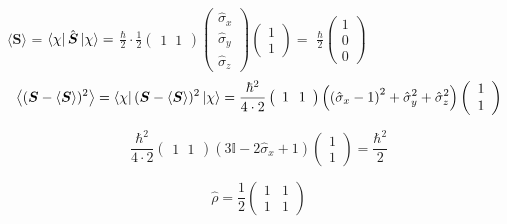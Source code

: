 \begin{solution}
	$\langle\boldsymbol{S}\rangle$ = $\bra{\chi}\hat{\boldsymbol{S}}\ket{\chi} = $
	$\displaystyle \frac{\hbar}{2} \cdot \frac{1}{2} \left(\begin{array}{l}{1} \hspace{7pt} {1}\end{array}\right)
	 \left(\begin{array}{c}{\hat{\sigma}_{x}} \\ {\hat{\sigma}_{y}} \\ {\hat{\sigma}_{z}}\end{array}\right) \left(\begin{array}{l}{1} \\ {1}\end{array}\right)= $ 
	 $
	 	\frac{\hbar}{2} \left(\begin{array}{l}{1} \\ {0} \\ {0}\end{array}\right)
	 $
	 $$
	 \left\langle(\boldsymbol{S}-\langle\boldsymbol{S}\rangle)^{2}\right\rangle= \bra{\chi}( 
	 \boldsymbol{S}-\langle\boldsymbol{S}\rangle)^{2}  \ket{\chi} =\frac{\hbar^2}{4\cdot 2} \left(\begin{array}{l}{1} \hspace{7pt} {1}\end{array}\right)
	 \left(\left(\hat{\sigma}_x -1\right)^2+ \hat{\sigma}_{y}^2 +\hat{\sigma}_{z}^2\right)
	 \left(\begin{array}{l}{1} \\ {1}\end{array}\right)
	 $$
	 
	 $$
	 \frac{\hbar^2}{4\cdot 2} \left(\begin{array}{l}{1} \hspace{7pt} {1}\end{array}\right)
	 \left(3\mathbb{I} -2\hat{\sigma}_x +1\right)
	 \left(\begin{array}{l}{1} \\ {1}\end{array}\right) = \frac{\hbar^2}{2}
	 $$
	 
	 
	 
	 $$
	 \hat{\rho}=\frac{1}{2}\left(\begin{array}{ll}{1} & {1} \\ {1} & {1}\end{array}\right)
	 $$
	 

\end{solution}
